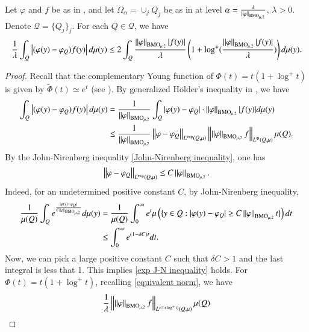 \documentclass[leqno]{amsart}
\begin{document}
\begin{lemma}\label{estimate to T32}
Let $\varphi$ and $f$ be as in , and let $\Omega_{\alpha}=\cup_jQ_j$ be as in  at level $\alpha=\frac{\lambda}{\left\| \varphi \right\|_{{\rm BMO}_{\mu,2}}}$, $\lambda>0$. Denote $\mathcal{Q}=\{Q_j\}_j$. For each $Q\in \mathcal{Q}$, we have
\begin{align*}
\frac{1}{\lambda}\int_{Q}\left|(\varphi(y)-\varphi_{Q})f(y)\right|d\mu(y)
\leq2\int_{Q}\frac{\left\| \varphi \right\|_{{\rm BMO}_{\mu,2}}|f(y)|}{\lambda}
\left(1+\log^{+}(\frac{\left\| \varphi \right\|_{{\rm BMO}_{\mu,2}}|f(y)|}{\lambda})\right)d\mu(y).
\end{align*}
\end{lemma}
\begin{proof}
Recall that the complementary Young function of $\Phi(t)=t(1+\log^{+}t)$ is given by $\widetilde{\Phi}(t)\simeq e^{t}$ (see \cite[Section 4.3]{PKJF-book}). By generalized H\"{o}lder's inequality in , we have
\begin{align*}
\int_{Q}\left|(\varphi(y)-\varphi_{Q})f(y)\right|d\mu(y)
&=\frac{1}{\left\| \varphi \right\|_{{\rm BMO}_{\mu,2}}}
\int_{Q}|\varphi(y)-\varphi_{Q}|\cdot\left\| \varphi \right\|_{{\rm BMO}_{\mu,2}}|f(y)|d\mu(y)\\
&\leq\frac{1}{\left\| \varphi \right\|_{{\rm BMO}_{\mu,2}}}
\left\| \varphi-\varphi_{Q} \right\|_{L^{\exp}(Q,\mu)}
\left\| \left\| \varphi \right\|_{{\rm BMO}_{\mu,2}}f \right\|_{L^{\Phi}(Q,\mu)}\mu(Q).
\end{align*}
By the John-Nirenberg inequality \eqref{John-Nirenberg inequality}, one has
\begin{align}\label{exp J-N inequality}
\left\| \varphi-\varphi_{Q} \right\|_{L^{\exp}(Q,\mu)}\leq C\left\| \varphi \right\|_{{\rm BMO}_{\mu,2}}.
\end{align}
Indeed, for an undetermined positive constant $C$, by John-Nirenberg inequality,
\begin{align*}
\frac{1}{\mu(Q)}\int_{Q}e^{\frac{|\varphi(y)-\varphi_{Q}|}{C\left\| \varphi \right\|_{{\rm BMO}_{\mu,2}}}}d\mu(y)
&=\frac{1}{\mu(Q)}\int_{0}^{\infty}e^{t}
\mu\left(\{y\in Q:|\varphi(y)-\varphi_{Q}|\geq C\left\| \varphi \right\|_{{\rm BMO}_{\mu,2}}t\}\right)dt\\
&\leq\int_{0}^{\infty}e^{(1-\delta C)t}dt.
\end{align*}
Now, we can pick a large positive constant $C$ such that $\delta C>1$ and the last integral is less that 1.  This implies \eqref{exp J-N inequality} holds.
For $\Phi(t)=t(1+\log^{+}t)$, recalling \eqref{equivalent norm}, we have
\begin{align*}
\frac{1}{\lambda}\Norm{\Norm{\varphi}_{\BMO_{\mu,2}}f}_{L^{t(1+\log^{+} t)}(Q,\mu)}\mu(Q)

\end{align*}
\end{proof}
\end{document}
